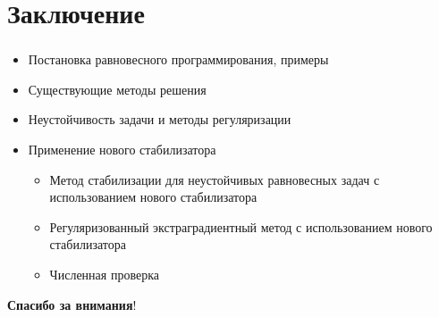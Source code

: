 \documentclass[unicode, t, 11pt]{beamer}%
\begin{document}
\section{Заключение}
\begin{frame}
\frametitle{\insertsection}
\begin{center}
	\begin{itemize}[label=\(\bullet\)]
		\item Постановка равновесного программирования, примеры
		\item Существующие методы решения 
		\item Неустойчивость задачи и методы регуляризации
		\item Применение нового стабилизатора
		\begin{itemize}[label=\(\bullet\)]
			\item  Метод стабилизации для неустойчивых равновесных задач с использованием нового стабилизатора
			\item  Регуляризованный экстраградиентный метод с использованием нового стабилизатора
			\item Численная проверка
		\end{itemize} 
	\end{itemize}
\end{center}

\end{frame}

	\begin{frame}
	\vfill
	\centering
	\huge \textbf{Спасибо за внимания}!
	\vfill
\end{frame}
\end{document}
